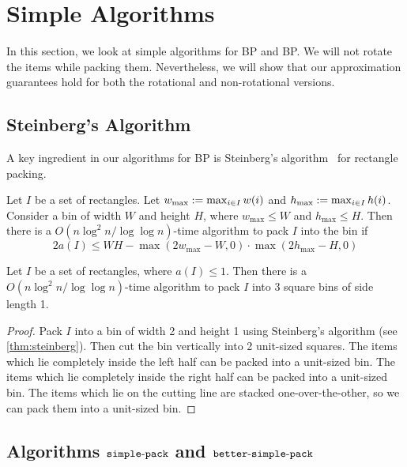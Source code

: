 \section{Simple Algorithms}
\label{sec:simple-algos}
\label{sec:span-pack}

In this section, we look at simple algorithms for  BP
and  BP.
We will not rotate the items while packing them.
Nevertheless, we will show that our approximation guarantees
hold for both the rotational and non-rotational versions.

\subsection{Steinberg's Algorithm}

A key ingredient in our algorithms for  BP is
Steinberg's algorithm~\cite{steinberg1997strip} for rectangle packing.

\begin{lemma}
\label{thm:steinberg}
Let $I$ be a set of rectangles. Let $w_{\max} := \max_{i \in I} w(i)$
and $h_{\max} := \max_{i \in I} h(i)$. Consider a bin of width $W$ and height $H$,
where $w_{\max} \le W$ and $h_{\max} \le H$.
Then there is a $O(n\log^2 n/\log\log n)$-time algorithm to pack $I$ into the bin if
\[ 2a(I) \le WH - \max(2w_{\max} - W, 0) \cdot \max(2h_{\max} - H, 0) \]
\end{lemma}

\begin{lemma}
\label{corr:steinberg}
Let $I$ be a set of rectangles, where $a(I) \le 1$.
Then there is a $O(n\log^2 n/\log\log n)$-time algorithm to pack $I$ into
3 square bins of side length 1.
\end{lemma}
\begin{proof}
Pack $I$ into a bin of width 2 and height 1 using Steinberg's algorithm
(see \cref{thm:steinberg}).
Then cut the bin vertically into 2 unit-sized squares.
The items which lie completely inside the left half can be packed into a unit-sized bin.
The items which lie completely inside the right half can be packed into a unit-sized bin.
The items which lie on the cutting line are stacked one-over-the-other,
so we can pack them into a unit-sized bin.
\end{proof}

\subsection{Algorithms \texorpdfstring{$\operatorname{\mathtt{simple-pack}}$}{simple-pack}
and \texorpdfstring{$\operatorname{\mathtt{better-simple-pack}}$}{better-simple-pack}}

